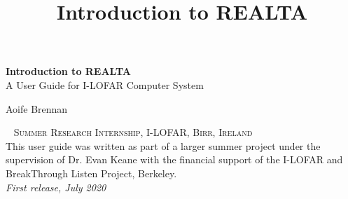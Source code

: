 \documentclass[11pt,fleqn]{book} %
\begin{document}
\title{Introduction to REALTA}


\begingroup
\thispagestyle{empty}
\centering
\vspace*{5cm}
\par\normalfont\fontsize{35}{35}\sffamily\selectfont
\textbf{Introduction to REALTA}\\
{\LARGE A User Guide for I-LOFAR Computer System}\par %
\vspace*{1cm}
{\Huge Aoife Brennan}\par %
\endgroup


\newpage
~\vfill
\thispagestyle{empty}
\noindent \textsc{Summer Research Internship, I-LOFAR, Birr, Ireland}\\



\noindent This user guide was written as part of a larger summer project under the supervision of Dr. Evan Keane with the financial support of the I-LOFAR and  BreakThrough Listen Project, Berkeley. \\ %


%
\noindent \textit{First release, July 2020} %




\pagestyle{empty} %

\tableofcontents %
%

\pagestyle{fancy} %
\end{document}

